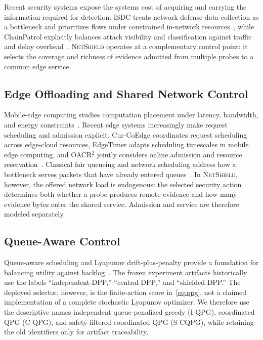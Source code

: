 \documentclass[10pt,journal]{IEEEtran}
\newcommand{\NetShield}{\textsc{NetShield}}
\newcommand{\IQPG}{\textsc{I-QPG}}
\newcommand{\CQPG}{\textsc{C-QPG}}
\newcommand{\SCQPG}{\textsc{S-CQPG}}
\begin{document}
Recent security systems expose the systems cost of acquiring and carrying
the information required for detection. ISDC treats network-defense data
collection as a bottleneck and prioritizes flows under constrained
in-network resources~\cite{mirnajafizadeh2024isdc}, while ChainPatrol
explicitly balances attack visibility and classification against traffic
and delay overhead~\cite{oqaily2024chainpatrol}. \NetShield{} operates at
a complementary control point: it selects the coverage and richness of
evidence admitted from multiple probes to a common edge service.

\subsection{Edge Offloading and Shared Network Control}

Mobile-edge computing studies computation placement under latency,
bandwidth, and energy constraints~\cite{mao2017mec,mach2017mec}.
Recent edge systems increasingly make request scheduling and admission
explicit. Cur-CoEdge coordinates request scheduling across edge-cloud
resources, EdgeTimer adapts scheduling timescales in mobile edge
computing, and OACR$^2$ jointly considers online admission and resource
reservation~\cite{zhao2024curcoedge,hao2024edgetimer,li2025oacr2}.
Classical fair queueing and network scheduling address how a bottleneck
serves packets that have already entered queues~\cite{demers1989fair,
parekh1993gps}. In \NetShield{}, however, the offered network load is
endogenous: the selected security action determines both whether a probe
produces remote evidence and how many evidence bytes enter the shared
service. Admission and service are therefore modeled separately.

\subsection{Queue-Aware Control}

Queue-aware scheduling and Lyapunov drift-plus-penalty provide a
foundation for balancing utility against backlog~\cite{tassiulas1992,
neely2010}. The frozen experiment artifacts historically use the labels
``independent-DPP,'' ``central-DPP,'' and ``shielded-DPP.'' The deployed
selector, however, is the finite-action score in~\eqref{eq:qpg}, not a
claimed implementation of a complete stochastic Lyapunov optimizer.
We therefore use the descriptive names independent queue-penalized
greedy (\IQPG), coordinated QPG (\CQPG), and safety-filtered coordinated
QPG (\SCQPG), while retaining the old identifiers only for artifact
traceability.
\end{document}
